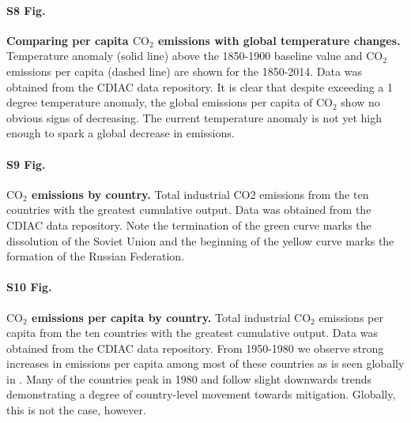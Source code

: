 \documentclass[10pt,letterpaper]{article}
\begin{document}
\paragraph*{S8 Fig.}
\label{S8_fig}
\textbf{Comparing per capita $\text{CO}_2$ emissions with global temperature changes.} Temperature anomaly (solid line) above the 1850-1900 baseline value and $\text{CO}_2$ emissions per capita (dashed line) are shown for the 1850-2014. Data was obtained from the CDIAC data repository\cite{boden17}. It is clear that despite exceeding a 1 degree temperature anomaly, the global emissions per capita of $\text{CO}_2$ show no obvious signs of decreasing. The current temperature anomaly is not yet high enough to spark a global decrease in emissions.

\paragraph*{S9 Fig.}
\label{S9_fig}
\textbf{$\text{CO}_2$ emissions by country.} Total industrial CO2 emissions from the ten countries with the greatest cumulative output. Data was obtained from the CDIAC data repository\cite{boden17}. Note the termination of the green curve marks the dissolution of the Soviet Union and the beginning of the yellow curve marks the formation of the Russian Federation.

\paragraph*{S10 Fig.}
\label{S10_fig}
\textbf{$\text{CO}_2$ emissions per capita by country.} Total industrial  $\text{CO}_2$ emissions per capita from the ten countries with the greatest cumulative output. Data was obtained from the CDIAC data repository\cite{boden17}. From 1950-1980 we observe strong increases in emissions per capita among most of these countries as is seen globally in . Many of the countries peak in 1980 and follow slight downwards trends demonstrating a degree of country-level movement towards mitigation. Globally, this is not the case, however.





\nolinenumbers

%
%
% 



\end{document}
